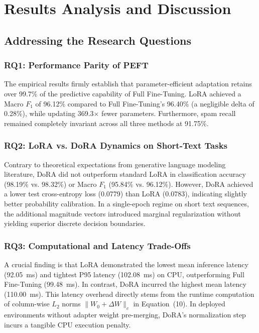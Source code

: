 \documentclass[conference]{IEEEtran}
\begin{document}
\section{Results Analysis and Discussion}
\label{sec:discussion}

\subsection{Addressing the Research Questions}

\subsubsection{RQ1: Performance Parity of PEFT}
The empirical results firmly establish that parameter-efficient adaptation retains over 99.7\% of the predictive capability of Full Fine-Tuning. LoRA achieved a Macro $F_1$ of 96.12\% compared to Full Fine-Tuning's 96.40\% (a negligible delta of 0.28\%), while updating 369.3$\times$ fewer parameters. Furthermore, spam recall remained completely invariant across all three methods at 91.75\%.

\subsubsection{RQ2: LoRA vs. DoRA Dynamics on Short-Text Tasks}
Contrary to theoretical expectations from generative language modeling literature, DoRA did not outperform standard LoRA in classification accuracy (98.19\% vs. 98.32\%) or Macro $F_1$ (95.84\% vs. 96.12\%). However, DoRA achieved a lower test cross-entropy loss (0.0779) than LoRA (0.0783), indicating slightly better probability calibration. In a single-epoch regime on short text sequences, the additional magnitude vectors introduced marginal regularization without yielding superior discrete decision boundaries.

\subsubsection{RQ3: Computational and Latency Trade-Offs}
A crucial finding is that LoRA demonstrated the lowest mean inference latency (92.05~ms) and tightest P95 latency (102.08~ms) on CPU, outperforming Full Fine-Tuning (99.48~ms). In contrast, DoRA incurred the highest mean latency (110.00~ms). This latency overhead directly stems from the runtime computation of column-wise $L_2$ norms $\|W_0 + \Delta W\|_c$ in Equation~(10). In deployed environments without adapter weight pre-merging, DoRA's normalization step incurs a tangible CPU execution penalty.
\end{document}
